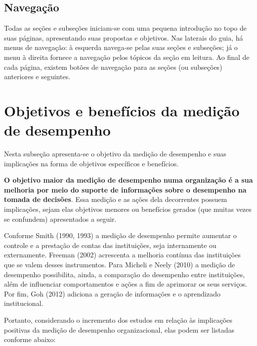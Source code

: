 \documentclass[
  letterpaper,
  DIV=11,
  numbers=noendperiod]{scrreprt}
\begin{document}
\hypertarget{navegauxe7uxe3o}{%
\section{Navegação}\label{navegauxe7uxe3o}}

Todas as seções e subseções iniciam-se com uma pequena introdução no
topo de suas páginas, apresentando suas propostas e objetivos. Nas
laterais do guia, há menus de navegação: à esquerda navega-se pelas suas
seções e subseções; já o menu à direita fornece a navegação pelos
tópicos da seção em leitura. Ao final de cada página, existem botões de
navegação para as seções (ou subseções) anteriores e seguintes.

\hypertarget{objetivos-e-benefuxedcios-da-mediuxe7uxe3o-de-desempenho}{%
\chapter{Objetivos e benefícios da medição de
desempenho}\label{objetivos-e-benefuxedcios-da-mediuxe7uxe3o-de-desempenho}}

{Nesta subseção apresenta-se o objetivo da medição de desempenho e suas
implicações na forma de objetivos específicos e benefícios.}

\textbf{O objetivo maior da medição de desempenho numa organização é a
sua melhoria por meio do suporte de informações sobre o desempenho na
tomada de decisões}. Essa medição e as ações dela decorrentes possuem
implicações, sejam elas objetivos menores ou benefícios gerados (que
muitas vezes se confundem) apresentados a seguir.

Conforme Smith (1990, 1993) a medição de desempenho permite aumentar o
controle e a prestação de contas das instituições, seja internamente ou
externamente. Freeman (2002) acrescenta a melhoria contínua das
instituições que se valem desses instrumentos. Para Micheli e Neely
(2010) a medição de desempenho possibilita, ainda, a comparação do
desempenho entre instituições, além de influenciar comportamentos e
ações a fim de aprimorar os seus serviços. Por fim, Goh (2012) adiciona
a geração de informações e o aprendizado institucional.

Portanto, considerando o incremento dos estudos em relação às
implicações positivas da medição de desempenho organizacional, elas
podem ser listadas conforme abaixo:
\end{document}
